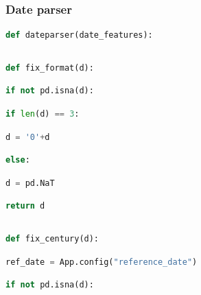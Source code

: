 \documentclass[
  11pt,
  a4paper,
  DIV=12,captions=tableheading,oneside]{scrbook}
\begin{document}
\hypertarget{code-dateparser}{%
\subsubsection{Date parser}\label{code-dateparser}}

\begin{lstlisting}[language=Python,stepnumber=2,basicstyle=\footnotesize]
def dateparser(date_features):\end{lstlisting}
\begin{lstlisting}[language=Python,stepnumber=2,basicstyle=\footnotesize]
\end{lstlisting}
\begin{lstlisting}[language=Python,stepnumber=2,basicstyle=\footnotesize]
    def fix_format(d):\end{lstlisting}
\begin{lstlisting}[language=Python,stepnumber=2,basicstyle=\footnotesize]
        if not pd.isna(d):\end{lstlisting}
\begin{lstlisting}[language=Python,stepnumber=2,basicstyle=\footnotesize]
            if len(d) == 3:\end{lstlisting}
\begin{lstlisting}[language=Python,stepnumber=2,basicstyle=\footnotesize]
                d = '0'+d\end{lstlisting}
\begin{lstlisting}[language=Python,stepnumber=2,basicstyle=\footnotesize]
        else:\end{lstlisting}
\begin{lstlisting}[language=Python,stepnumber=2,basicstyle=\footnotesize]
            d = pd.NaT\end{lstlisting}
\begin{lstlisting}[language=Python,stepnumber=2,basicstyle=\footnotesize]
        return d\end{lstlisting}
\begin{lstlisting}[language=Python,stepnumber=2,basicstyle=\footnotesize]
\end{lstlisting}
\begin{lstlisting}[language=Python,stepnumber=2,basicstyle=\footnotesize]
    def fix_century(d):\end{lstlisting}
\begin{lstlisting}[language=Python,stepnumber=2,basicstyle=\footnotesize]
        ref_date = App.config("reference_date")\end{lstlisting}
\begin{lstlisting}[language=Python,stepnumber=2,basicstyle=\footnotesize]
        if not pd.isna(d):\end{lstlisting}
\end{document}
